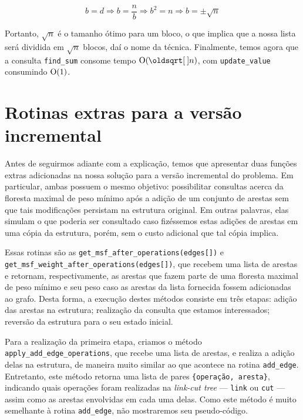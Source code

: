 \begin{equation}
    b = d \Rightarrow
    b = \frac{n}{b} \Rightarrow
    b^2 = n \Rightarrow
    b = \pm \sqrt{n}
\end{equation}

Portanto, $\sqrt{n}$ é o tamanho ótimo para um bloco, o que implica que a nossa lista será dividida em $\sqrt{n}$ blocos, daí o nome da técnica. Finalmente, temos agora que a consulta \texttt{find\_sum} consome tempo $\Oh(\sqrt{n})$, com \texttt{update\_value} consumindo $\mathrm{O}(1)$.

\section{Rotinas extras para a versão incremental}
\label{sec:rmsf-extras}

Antes de seguirmos adiante com a explicação, temos que apresentar duas funções extras adicionadas na nossa solução para a versão incremental do problema. Em particular, ambas possuem o mesmo objetivo: possibilitar consultas acerca da floresta maximal de peso mínimo após a adição de um conjunto de arestas sem que tais modificações persistam na estrutura original. Em outras palavras, elas simulam o que poderia ser consultado caso fizéssemos estas adições de arestas em uma cópia da estrutura, porém, sem o custo adicional que tal cópia implica.

Essas rotinas são as \texttt{get\_msf\_after\_operations(edges[])} e \texttt{get\_msf\_weight\_after\_operations(edges[])}, que recebem uma lista de arestas e retornam, respectivamente, as arestas que fazem parte de uma floresta maximal de peso mínimo e seu peso caso as arestas da lista fornecida fossem adicionadas ao grafo. Desta forma, a execução destes métodos consiste em três etapas: adição das arestas na estrutura; realização da consulta que estamos interessados; reversão da estrutura para o seu estado inicial.

Para a realização da primeira etapa, criamos o método \texttt{apply\_add\_edge\_operations}, que recebe uma lista de arestas, e realiza a adição delas na estrutura, de maneira muito similar ao que acontece na rotina \texttt{add\_edge}. Entretanto, este método retorna uma lista de pares \texttt{\{operação, aresta\}}, indicando quais operações foram realizadas na \emph{link-cut tree} --- \texttt{link} ou \texttt{cut} --- assim como as arestas envolvidas em cada uma delas. Como este método é muito semelhante à rotina \texttt{add\_edge}, não mostraremos seu pseudo-código.

